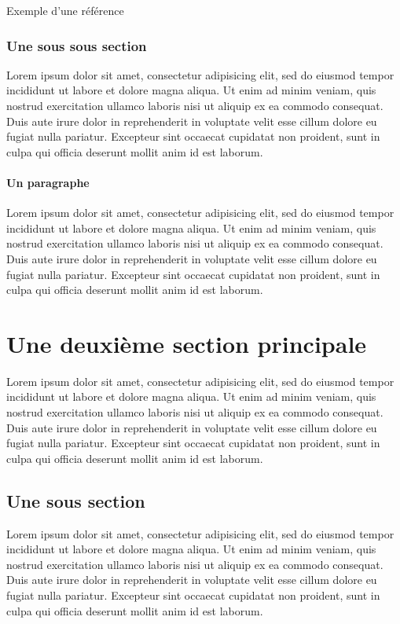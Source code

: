 
Exemple d'une référence \cite{zadeh1978fuzzy}

\subsubsection{Une sous sous section}
Lorem ipsum dolor sit amet, consectetur adipisicing elit, sed do eiusmod
tempor incididunt ut labore et dolore magna aliqua. Ut enim ad minim veniam,
quis nostrud exercitation ullamco laboris nisi ut aliquip ex ea commodo
consequat. Duis aute irure dolor in reprehenderit in voluptate velit esse
cillum dolore eu fugiat nulla pariatur. Excepteur sint occaecat cupidatat non
proident, sunt in culpa qui officia deserunt mollit anim id est laborum.

\paragraph{Un paragraphe}
Lorem ipsum dolor sit amet, consectetur adipisicing elit, sed do eiusmod
tempor incididunt ut labore et dolore magna aliqua. Ut enim ad minim veniam,
quis nostrud exercitation ullamco laboris nisi ut aliquip ex ea commodo
consequat. Duis aute irure dolor in reprehenderit in voluptate velit esse
cillum dolore eu fugiat nulla pariatur. Excepteur sint occaecat cupidatat non
proident, sunt in culpa qui officia deserunt mollit anim id est laborum.

\section{Une deuxième section principale}
Lorem ipsum dolor sit amet, consectetur adipisicing elit, sed do eiusmod
tempor incididunt ut labore et dolore magna aliqua. Ut enim ad minim veniam,
quis nostrud exercitation ullamco laboris nisi ut aliquip ex ea commodo
consequat. Duis aute irure dolor in reprehenderit in voluptate velit esse
cillum dolore eu fugiat nulla pariatur. Excepteur sint occaecat cupidatat non
proident, sunt in culpa qui officia deserunt mollit anim id est laborum.

\subsection{Une sous section}
Lorem ipsum dolor sit amet, consectetur adipisicing elit, sed do eiusmod
tempor incididunt ut labore et dolore magna aliqua. Ut enim ad minim veniam,
quis nostrud exercitation ullamco laboris nisi ut aliquip ex ea commodo
consequat. Duis aute irure dolor in reprehenderit in voluptate velit esse
cillum dolore eu fugiat nulla pariatur. Excepteur sint occaecat cupidatat non
proident, sunt in culpa qui officia deserunt mollit anim id est laborum.

